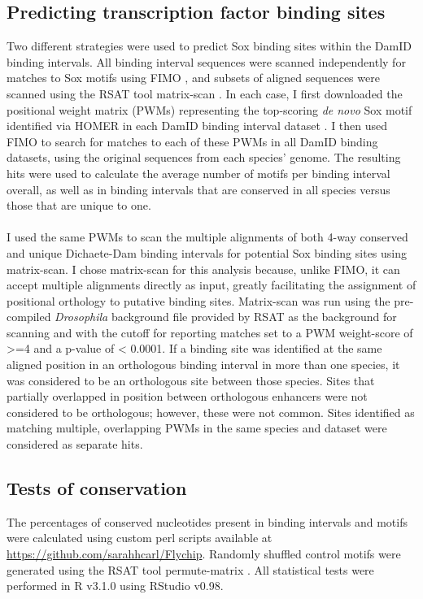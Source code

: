 \subsection{Predicting transcription factor binding sites}
Two different strategies were used to predict Sox binding sites within the DamID binding intervals. All binding interval sequences were scanned independently for matches to Sox motifs using FIMO \citep{grant_fimo:_2011}, and subsets of aligned sequences were scanned using the RSAT tool matrix-scan \citep{sand_analyzing_2008,turatsinze_using_2008}. In each case, I first downloaded the positional weight matrix (PWMs) representing the top-scoring \emph{de novo} Sox motif identified via HOMER in each DamID binding interval dataset \citep{heinz_simple_2010}. I then used FIMO to search for matches to each of these PWMs in all DamID binding datasets, using the original sequences from each species’ genome. The resulting hits were used to calculate the average number of motifs per binding interval overall, as well as in binding intervals that are conserved in all species versus those that are unique to one. 
\paragraph{}
I used the same PWMs to scan the multiple alignments of both 4-way conserved and unique Dichaete-Dam binding intervals for potential Sox binding sites using matrix-scan. I chose matrix-scan for this analysis because, unlike FIMO, it can accept multiple alignments directly as input, greatly facilitating the assignment of positional orthology to putative binding sites. Matrix-scan was run using the pre-compiled \emph{Drosophila} background file provided by RSAT as the background for scanning and with the cutoff for reporting matches set to a PWM weight-score of >=4 and a p-value of < 0.0001. If a binding site was identified at the same aligned position in an orthologous binding interval in more than one species, it was considered to be an orthologous site between those species. Sites that partially overlapped in position between orthologous enhancers were not considered to be orthologous; however, these were not common. Sites identified as matching multiple, overlapping PWMs in the same species and dataset were considered as separate hits. 

\subsection{Tests of conservation}
The percentages of conserved nucleotides present in binding intervals and motifs were calculated using custom perl scripts available at \url{https://github.com/sarahhcarl/Flychip}. Randomly shuffled control motifs were generated using the RSAT tool permute-matrix \citep{thomas-chollier_rsat_2011}. All statistical tests were performed in R v3.1.0 using RStudio v0.98.

